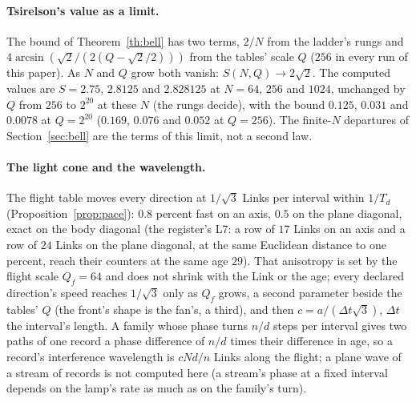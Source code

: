 \documentclass[11pt]{article}
\theoremstyle{definition}
\begin{document}
\paragraph{Tsirelson's value as a limit.} The bound of
Theorem~\ref{th:bell} has two terms, $2/N$ from the ladder's rungs and
$4\arcsin(\sqrt2/(2(Q - \sqrt2/2)))$ from the tables' scale $Q$ ($256$ in
every run of this paper). As $N$ and $Q$ grow both vanish: $S(N, Q) \to 2\sqrt2$. The
computed values are $S = 2.75$, $2.8125$ and $2.828125$ at $N = 64$, $256$
and $1024$, unchanged by $Q$ from $256$ to $2^{20}$ at these $N$ (the rungs
decide), with the bound $0.125$, $0.031$ and $0.0078$ at $Q = 2^{20}$
($0.169$, $0.076$ and $0.052$ at $Q = 256$). The
finite-$N$ departures of Section~\ref{sec:bell} are the terms of this
limit, not a second law.

\paragraph{The light cone and the wavelength.} The flight table moves
every direction at $1/\sqrt3$ Links per interval within $1/T_d$
(Proposition~\ref{prop:pace}): $0.8$
percent fast on an axis, $0.5$ on the plane diagonal, exact on the body
diagonal (the register's L7: a row of $17$ Links on an axis and a row of
$24$ Links on the plane diagonal, at the same Euclidean distance to one
percent, reach their counters at the same age $29$). That anisotropy is
set by the flight scale $Q_f = 64$ and does not shrink with the Link or
the age; every declared direction's speed reaches $1/\sqrt3$ only as $Q_f$
grows, a second parameter beside the tables' $Q$ (the front's shape is
the fan's, a third), and then $c = a/(\Delta t\sqrt3)$, $\Delta t$ the
interval's length. A family whose
phase turns $n/d$ steps per interval gives two paths of one record a
phase difference of $n/d$ times their difference in age, so a record's
interference wavelength is $cNd/n$ Links along the flight; a plane wave
of a stream of records is not computed here (a stream's phase at a fixed
interval depends on the lamp's rate as much as on the family's turn).
\end{document}

